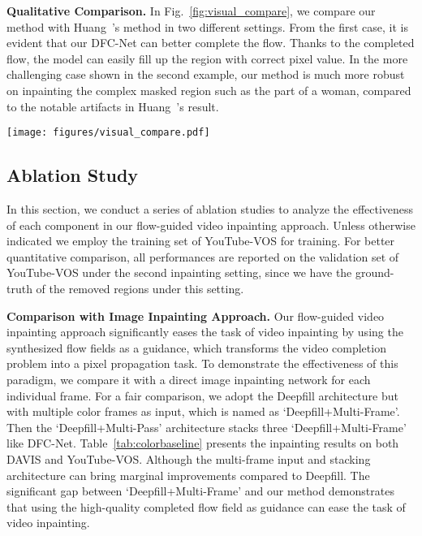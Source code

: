 \documentclass[10pt,twocolumn,letterpaper]{article}
\begin{document}
\noindent
\textbf{Qualitative Comparison.}
In Fig.~\ref{fig:visual_compare}, we compare our method with Huang~\etal 's method in two different settings.
From the first case, it is evident that our DFC-Net can better complete the flow. 
Thanks to the completed flow, the model can easily fill up the region with correct pixel value.
In the more challenging case shown in the second example,  our method is much more robust on inpainting the complex masked region such as the part of a woman, compared to the notable artifacts in Huang~\etal's result.


\begin{figure*}[tb]
	\centering
	\texttt{[image: figures/visual\_compare.pdf]}
	\vspace{-13pt}
	\caption{\small{Comparison with Huang~\etal.}}
	\label{fig:visual_compare}
	\vspace{-13pt}
\end{figure*}


\subsection{Ablation Study}
In this section, we conduct a series of ablation studies to analyze the effectiveness of each component in our flow-guided video inpainting approach.
Unless otherwise indicated we employ the training set of YouTube-VOS for training.
For better quantitative comparison, all performances are reported on the validation set of YouTube-VOS under the second inpainting setting, since we have the ground-truth of the removed regions under this setting.

\noindent
\textbf{Comparison with Image Inpainting Approach.}
Our flow-guided video inpainting approach significantly eases the task of video inpainting by using the synthesized flow fields as a guidance, which transforms the video completion problem into a pixel propagation task.
To demonstrate the effectiveness of this paradigm, we compare it with a direct image inpainting network for each individual frame.
For a fair comparison, we adopt the Deepfill architecture but with multiple color frames as input, which is named as `Deepfill+Multi-Frame'. 
Then the `Deepfill+Multi-Pass' architecture stacks three `Deepfill+Multi-Frame' like DFC-Net.
Table~\ref{tab:colorbaseline} presents the inpainting results on both DAVIS and YouTube-VOS.
Although the multi-frame input and stacking architecture can bring marginal improvements compared to Deepfill.
The significant gap between `Deepfill+Multi-Frame' and our method demonstrates that using the high-quality completed flow field as guidance can ease the task of video inpainting. 
\end{document}
